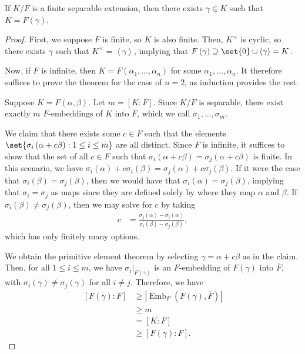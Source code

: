 \documentclass[10pt]{mypackage}
\begin{document}
\begin{theorem}
  If $K/F$ is a finite separable extension, then there exists $\gamma\in K$ such that $K = F\left( \gamma \right)$.
\end{theorem}
\begin{proof}
  First, we suppose $F$ is finite, so $K$ is also finite. Then, $K^{\times}$ is cyclic, so there exists $\gamma$ such that $K^{\times} = \left\langle \gamma \right\rangle$, implying that $F\left( \gamma \right)\supseteq \set{0}\cup \left\langle \gamma \right\rangle = K$.

  Now, if $F$ is infinite, then $K = F\left( \alpha_1,\dots,\alpha_n \right)$ for some $\alpha_1,\dots,\alpha_n$. It therefore suffices to prove the theorem for the case of $n = 2$, as induction provides the rest.

  Suppose $K = F\left( \alpha,\beta \right)$. Let $m = \left[ K:F \right]$. Since $K/F$ is separable, there exist exactly $m$ $F$-embeddings of $K$ into $ \overline{F} $, which we call $\sigma_1,\dots,\sigma_m$.

  We claim that there exists some $c\in F$ such that the elements $\set{\sigma_i\left( \alpha + c\beta \right) : 1\leq i \leq m}$ are all distinct. Since $F$ is infinite, it suffices to show that the set of all $c\in F$ such that $\sigma_i\left( \alpha + c\beta \right) = \sigma_j\left( \alpha + c\beta \right)$ is finite. In this scenario, we have $\sigma_i\left( \alpha \right) + c\sigma_i\left( \beta \right) = \sigma_j\left( \alpha \right) + c\sigma_j\left( \beta \right)$. If it were the case that $\sigma_i\left( \beta \right) = \sigma_j\left( \beta \right)$, then we would have that $\sigma_i\left( \alpha \right) = \sigma_j\left( \beta \right)$, implying that $\sigma_i = \sigma_j$ as maps since they are defined solely by where they map $\alpha$ and $\beta$. If $\sigma_i\left( \beta \right)\neq \sigma_j\left( \beta \right)$, then we may solve for $c$ by taking
  \begin{align*}
    c &= \frac{\sigma_j\left( \alpha \right) - \sigma_i\left( \alpha \right)}{\sigma_i\left( \beta \right)-\sigma_j\left( \beta \right)},
  \end{align*}
  which has only finitely many options.

  We obtain the primitive element theorem by selecting $\gamma = \alpha + c\beta$ as in the claim. Then, for all $1\leq i \leq m$, we have $\sigma_i|_{F(\gamma)}$ is an $F$-embedding of $F\left( \gamma \right)$ into $ \overline{F} $, with $\sigma_i(\gamma)\neq \sigma_j\left( \gamma \right)$ for all $i\neq j$. Therefore, we have
  \begin{align*}
    \left[ F\left( \gamma \right):F \right] &\geq \left\vert \operatorname{Emb}_F\left( F\left( \gamma \right), \overline{F} \right) \right\vert\\
                                            &\geq m\\
                                            &= \left[ K:F \right]\\
                                            &\geq \left[ F\left( \gamma \right):F \right].
  \end{align*}
\end{proof}
\end{document}
